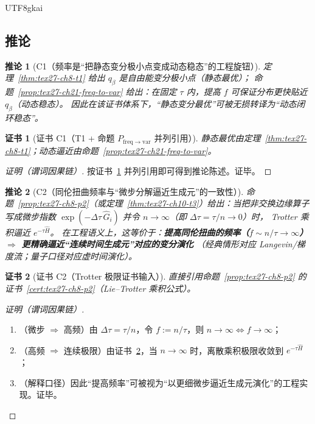 \documentclass[12pt]{article}
\newtheorem{corollary}{推论}[section]
\newtheorem{Certificate}{证书}[section]
\begin{document}
\begin{CJK*}{UTF8}{gkai}
\subsection{推论}
\label{subsec:tex27-ch21-corollaries}

\begin{corollary}[C1（频率是“把静态变分极小点变成动态稳态”的工程旋钮）]
\label{cor:tex27-ch21-c1}
定理~\ref{thm:tex27-ch8-t1} 给出 $q_\beta$ 是自由能变分极小点（静态最优）；
命题~\ref{prop:tex27-ch21-freq-to-var} 给出：在固定 $\tau$ 内，提高 $f$ 可保证分布更快贴近 $q_\beta$（动态稳态）。
因此在该证书体系下，“静态变分最优”可被无损转译为“动态闭环稳态”。
\end{corollary}

\begin{Certificate}[证书 C1（T1 + 命题 $P_{\mathrm{freq\to var}}$ 并列引用）]
\label{cert:tex27-ch21-c1}
静态最优由定理~\ref{thm:tex27-ch8-t1}；动态逼近由命题~\ref{prop:tex27-ch21-freq-to-var}。
\end{Certificate}

\begin{proof}[证明（谓词因果链）]
按证书~\ref{cert:tex27-ch21-c1} 并列引用即可得到推论陈述。证毕。
\end{proof}

\begin{corollary}[C2（同伦扭曲频率与“微步分解逼近生成元”的一致性）]
\label{cor:tex27-ch21-c2}
命题~\ref{prop:tex27-ch8-p2}（或定理~\ref{thm:tex27-ch10-t3}）给出：当把非交换边缘算子写成微步指数
$\exp(-\Delta\tau\,\widehat{G}_i)$ 并令 $n\to\infty$（即 $\Delta\tau=\tau/n\to 0$）时，
Trotter 乘积逼近 $e^{-\tau\widehat{H}}$。
在工程语义上，这等价于：\textbf{提高同伦扭曲的频率（$f\sim n/\tau\to\infty$）$\Rightarrow$ 更精确逼近“连续时间生成元”对应的变分演化}
（经典情形对应 Langevin/梯度流；量子口径对应虚时间演化）。
\end{corollary}

\begin{Certificate}[证书 C2（Trotter 极限证书输入）]
\label{cert:tex27-ch21-c2}
直接引用命题~\ref{prop:tex27-ch8-p2} 的证书~\ref{cert:tex27-ch8-p2}（Lie--Trotter 乘积公式）。
\end{Certificate}

\begin{proof}[证明（谓词因果链）]
\begin{enumerate}
  \item（微步 $\Rightarrow$ 高频）由 $\Delta\tau=\tau/n$，令 $f:=n/\tau$，则 $n\to\infty\iff f\to\infty$；
  \item（高频 $\Rightarrow$ 连续极限）由证书~\ref{cert:tex27-ch21-c2}，当 $n\to\infty$ 时，离散乘积极限收敛到 $e^{-\tau\widehat{H}}$；
  \item（解释口径）因此“提高频率”可被视为“以更细微步逼近生成元演化”的工程实现。证毕。
\end{enumerate}
\end{proof}


\end{CJK*}
\end{document}
